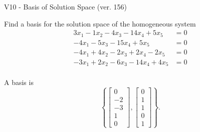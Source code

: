 \begin{exercise}
  \begin{exerciseTitle}V10 - Basis of Solution Space (ver. 156)\end{exerciseTitle}
  \begin{exerciseStatement}
    Find a basis for the solution space of the homogeneous system 
\begin{align*}
 3 x_ 1 -1 x_ 2 -4 x_ 3 -14 x_ 4 + 5 x_ 5 &= 0  \\ 
  -4 x_ 1 -5 x_ 3 -15 x_ 4 + 5 x_ 5 &= 0  \\ 
  -4 x_ 1 + 4 x_ 2 -2 x_ 3 + 2 x_ 4 -2 x_ 5 &= 0  \\ 
  -3 x_ 1 + 2 x_ 2 -6 x_ 3 -14 x_ 4 + 4 x_ 5 &= 0  \\ 
 \end{align*}


 
  \end{exerciseStatement}

  \begin{exerciseAnswer}
   A basis is   
\[\left\{\left[\begin{array}{c}
0 \\
-2 \\
-3 \\
1 \\
0
\end{array}\right] , \left[\begin{array}{c}
0 \\
1 \\
1 \\
0 \\
1
\end{array}\right]\right\}.\]

  


  \end{exerciseAnswer}
\end{exercise}
